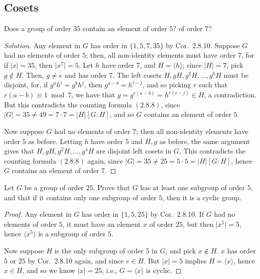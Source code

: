\documentclass[12pt]{article}
\theoremstyle{remark}
\begin{document}
\setcounter{subsection}{7}
\subsection{Cosets}
\setcounter{subsubsection}{3}
\begin{problem}
  Does a group of order $35$ contain an element of order $5$? of order $7$?
\end{problem}
\begin{proof}[Solution]
  Any element in $G$ has order in $\{1,5,7,35\}$ by Cor.~2.8.10. Suppose $G$ had no elements of order $5$; then, all non-identity elements must have order $7$, for if $\lvert x\rvert = 35$, then $\lvert x^7 \rvert = 5$. Let $h$ have order $7$, and $H = \langle h \rangle$; since $\lvert H \rvert = 7$, pick $g \notin H$. Then, $g \ne e$ and has order $7$. The left cosets $H,gH,g^2H,\ldots,g^6H$ must be disjoint, for, if $g^ah^i=g^bh^j$, then $g^{a-b} = h^{i-j}$, and so picking $r$ such that $r(a-b) \equiv 1 \bmod 7$, we have that $g = g^{r(a-b)} = h^{r(i-j)} \in H$, a contradiction. But this contradicts the counting formula $(2.8.8)$, since $\lvert G \rvert = 35 \ne 49 = 7 \cdot 7 = \lvert H \rvert[G:H]$, and so $G$ contains an element of order $5$.
  \par Now suppose $G$ had no elements of order $7$; then all non-identity elements have order $5$ as before. Letting $h$ have order $5$ and $H,g$ as before, the same argument gives that $H,gH,g^2H,\ldots,g^4H$ are disjoint left cosets in $G$. This contradicts the counting formula $(2.8.8)$ again, since $\lvert G \rvert = 35 \ne 25 = 5 \cdot 5 = \lvert H \rvert[G:H]$, hence $G$ contains an element of order $7$.
\end{proof}

\setcounter{subsubsection}{7}
\begin{problem}
  Let $G$ be a group of order $25$. Prove that $G$ has at least one subgroup of order $5$, and that if it contains only one subgroup of order $5$, then it is a cyclic group.
\end{problem}
\begin{proof}
  Any element in $G$ has order in $\{1,5,25\}$ by Cor.~2.8.10. If $G$ had no elements of order $5$, it must have an element $x$ of order $25$, but then $\lvert x^5 \rvert = 5$, hence $\langle x^5 \rangle$ is a subgroup of order $5$.
  \par Now suppose $H$ is the only subgroup of order $5$ in $G$, and pick $x \notin H$. $x$ has order $5$ or $25$ by Cor.~2.8.10 again, and since $e \in H$. But $\lvert x \rvert = 5$ implies $H = \langle x \rangle$, hence $x \in H$, and so we know $\lvert x \rvert = 25$, i.e., $G = \langle x \rangle$ is cyclic.
\end{proof}
\end{document}
